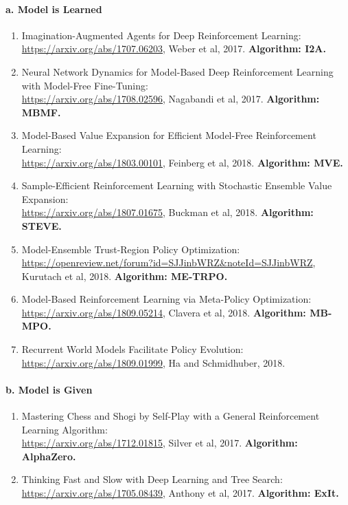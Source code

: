 \documentclass[lang=cn,11pt,a4paper]{eleganttemplate}
\begin{document}
\paragraph{a. Model is Learned}
\begin{enumerate}
    \item Imagination-Augmented Agents for Deep Reinforcement Learning:\\ \href{https://arxiv.org/abs/1707.06203}{https://arxiv.org/abs/1707.06203}, Weber et al, 2017. \textbf{Algorithm: I2A.}
    \item Neural Network Dynamics for Model-Based Deep Reinforcement Learning with Model-Free Fine-Tuning:\\ \href{https://arxiv.org/abs/1708.02596}{https://arxiv.org/abs/1708.02596}, Nagabandi et al, 2017. \textbf{Algorithm: MBMF.}
    \item Model-Based Value Expansion for Efficient Model-Free Reinforcement Learning:\\ \href{https://arxiv.org/abs/1803.00101}{https://arxiv.org/abs/1803.00101}, Feinberg et al, 2018. \textbf{Algorithm: MVE.}
    \item Sample-Efficient Reinforcement Learning with Stochastic Ensemble Value Expansion:\\ \href{https://arxiv.org/abs/1807.01675}{https://arxiv.org/abs/1807.01675}, Buckman et al, 2018. \textbf{Algorithm: STEVE.}
    \item Model-Ensemble Trust-Region Policy Optimization:\\ \href{https://openreview.net/forum?id=SJJinbWRZ&noteId=SJJinbWRZ}{https://openreview.net/forum?id=SJJinbWRZ\&noteId=SJJinbWRZ}, Kurutach et al, 2018. \textbf{Algorithm: ME-TRPO.}
    \item Model-Based Reinforcement Learning via Meta-Policy Optimization:\\ \href{https://arxiv.org/abs/1809.05214}{https://arxiv.org/abs/1809.05214}, Clavera et al, 2018. \textbf{Algorithm: MB-MPO.}
    \item Recurrent World Models Facilitate Policy Evolution:\\ \href{https://arxiv.org/abs/1809.01999}{https://arxiv.org/abs/1809.01999}, Ha and Schmidhuber, 2018.
\end{enumerate}


\paragraph{b. Model is Given}
\begin{enumerate}
    \item Mastering Chess and Shogi by Self-Play with a General Reinforcement Learning Algorithm:\\ \href{https://arxiv.org/abs/1712.01815}{https://arxiv.org/abs/1712.01815}, Silver et al, 2017. \textbf{Algorithm: AlphaZero.}
    \item Thinking Fast and Slow with Deep Learning and Tree Search:\\ \href{https://arxiv.org/abs/1705.08439}{https://arxiv.org/abs/1705.08439}, Anthony et al, 2017. \textbf{Algorithm: ExIt.}
\end{enumerate}
\end{document}
